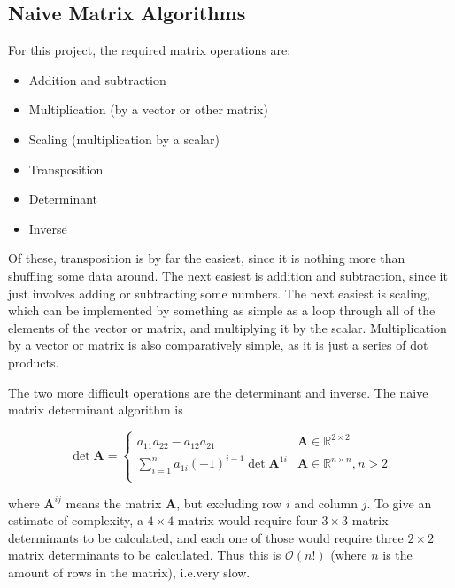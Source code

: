 \documentclass[12pt]{article}
\begin{document}
\subsection{Naive Matrix Algorithms}
\label{naive}

For this project, the required matrix operations are:

\begin{itemize}
	\item Addition and subtraction
	\item Multiplication (by a vector or other matrix)
	\item Scaling (multiplication by a scalar)
	\item Transposition
	\item Determinant
	\item Inverse
\end{itemize}

Of these, transposition is by far the easiest, since it is nothing more than shuffling some data around. The next easiest is addition and subtraction, since it just involves adding or subtracting some numbers. The next easiest is scaling, which can be implemented by something as simple as a loop through all of the elements of the vector or matrix, and multiplying it by the scalar. Multiplication by a vector or matrix is also comparatively simple, as it is just a series of dot products.

The two more difficult operations are the determinant and inverse. The naive matrix determinant algorithm \cite{strang2006linear} is

\begin{equation}
	\det{\mathbf{A}} = 
	\begin{cases}
	a_{11}a_{22} - a_{12}a_{21}& \mathbf{A} \in \mathbb{R}^{2 \times 2}\\
	\sum_{i=1}^{n} a_{1i}  (-1)^{i-1}\det{\mathbf{A}^{1i}} & \mathbf{A} \in \mathbb{R}^{n \times n}, n > 2\\
	\end{cases}
\end{equation}

\noindent
where $\mathbf{A}^{ij}$ means the matrix $\mathbf{A}$, but excluding row $i$ and column $j$. To give an estimate of complexity, a $4\times4$ matrix would require four $3\times3$ matrix determinants to be calculated, and each one of those would require three $2\times2$ matrix determinants to be calculated. Thus this is $\mathcal{O}(n!)$ (where $n$ is the amount of rows in the matrix), i.e.\@ very slow.
\end{document}
